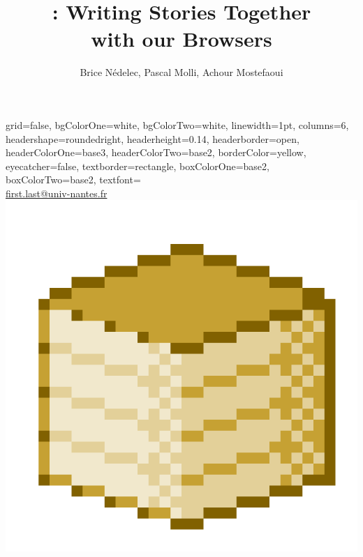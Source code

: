 \documentclass[a1paper, fontscale=0.4, portrait]{baposter}
\title{\CRATE: Writing Stories Together\vspace{0.4em} \\ with our Browsers}
\author{Brice Nédelec, Pascal Molli, Achour Mostefaoui}
\begin{document}
\begin{poster}{
    grid=false,
    bgColorOne=white,
    bgColorTwo=white,
    linewidth=1pt,
    columns=6,
    headershape=roundedright, 
    headerheight=0.14\textheight,
    headerborder=open,
    headerColorOne=base3,
    headerColorTwo=base2,
    borderColor=yellow,
    eyecatcher=false,
    textborder=rectangle,
    boxColorOne=base2,
    boxColorTwo=base2,
    textfont=\sffamily
  }
  {}
  {\huge\textsc{\thetitle}\vspace{0.6em}}
  {\theauthor \\ \url{first.last@univ-nantes.fr}}
  {\includegraphics[height=0.12\textheight, interpolate=false]{logos/crateicon.png}}


\end{poster}
\end{document}
